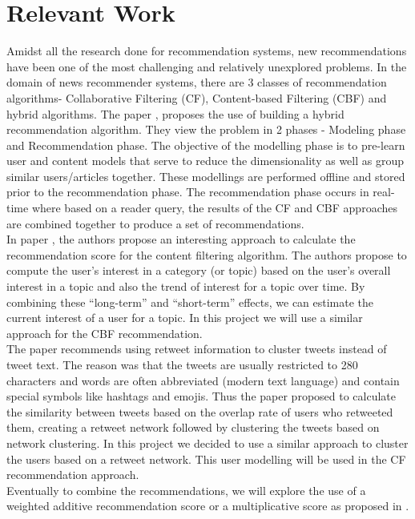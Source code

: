 \documentclass{article}
\begin{document}
\section{Relevant Work}

Amidst all the research done for recommendation systems, new recommendations have been one of the most challenging and relatively unexplored problems. In the domain of news recommender systems, there are 3 classes of recommendation algorithms- Collaborative Filtering (CF), Content-based Filtering (CBF) and hybrid algorithms. The paper \cite{ref1}, proposes the use of building a hybrid recommendation algorithm. They view the problem in 2 phases - Modeling phase and Recommendation phase. The objective of the modelling phase is to pre-learn user and content models that serve to reduce the dimensionality as well as group similar users/articles together. These modellings are performed offline and stored prior to the recommendation phase. The recommendation phase occurs in real-time where based on a reader query, the results of the CF and CBF approaches are combined together to produce a set of recommendations. \\  
In paper \cite{CBFpaper}, the authors propose an interesting approach to calculate the recommendation score for the content filtering algorithm. The authors propose to compute the user’s interest in a category (or topic) based on the user’s overall interest in a topic and also the trend of interest for a topic over time. By combining these “long-term” and “short-term” effects, we can estimate the current interest of a user for a topic. In this project we will use a similar approach for the CBF recommendation. \\
The paper \cite{userClustering} recommends using retweet information to cluster tweets instead of tweet text. The reason was that the tweets are usually restricted to 280 characters and words are often abbreviated (modern text language) and contain special symbols like hashtags and emojis. Thus the paper proposed to calculate the similarity between tweets based on the overlap rate of users who retweeted them, creating a retweet network followed by clustering the tweets based on network clustering.  In this project we decided to use a similar approach to cluster the users based on a retweet network. This user modelling will be used in the CF recommendation approach. \\
Eventually to combine the recommendations, we will explore the use of a weighted additive recommendation score or a multiplicative score as proposed in \cite{CBFpaper}.
\end{document}
